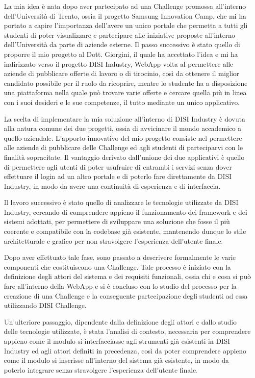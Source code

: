 La mia idea è nata dopo aver partecipato ad una Challenge promossa all'interno dell'Università di Trento, ossia il progetto Samsung Innovation Camp, che mi ha portato a capire l'importanza dell'avere un unico portale che permetta a tutti gli studenti di poter visualizzare e partecipare alle iniziative proposte all'interno dell'Università da parte di aziende esterne. Il passo successivo è stato quello di proporre il mio progetto al Dott. Giorgini, il quale ha accettato l'idea e mi ha indirizzato verso il progetto DISI Industry, WebApp volta al permettere alle aziende di pubblicare offerte di lavoro o di tirocinio, così da ottenere il miglior candidato possibile per il ruolo da ricoprire, mentre lo studente ha a disposizione una piattaforma nella quale può trovare varie offerte e cercare quella più in linea con i suoi desideri e le sue competenze, il tutto mediante un unico applicativo.

La scelta di implementare la mia soluzione all'interno di DISI Industry è dovuta alla natura comune dei due progetti, ossia di avvicinare il mondo accademico a quello aziendale. L'apporto innovativo del mio progetto consiste nel permettere alle aziende di pubblicare delle Challenge ed agli studenti di parteciparvi con le finalità sopracitate. Il vantaggio derivato dall'unione dei due applicativi è quello di permettere agli utenti di poter usufruire di entrambi i servizi senza dover effettuare il login ad un altro portale e di poterlo fare direttamente da DISI Industry, in modo da avere una continuità di esperienza e di interfaccia.


Il lavoro successivo è stato quello di analizzare le tecnologie utilizzate da DISI Industry, cercando di comprendere appieno il funzionamento dei framework e dei sistemi adottati, per permettere di sviluppare una soluzione che fosse il più coerente e compatibile con la codebase già esistente, mantenendo dunque lo stile architetturale e grafico per non stravolgere l'esperienza dell'utente finale.


Dopo aver effettuato tale fase, sono passato a descrivere formalmente le varie componenti che costituiscono una Challenge. Tale processo è iniziato con la definizione degli attori del sistema e dei requisiti funzionali, ossia chi e cosa si può fare all'interno della WebApp e si è concluso con lo studio del processo per la creazione di una Challenge e la conseguente partecipazione degli studenti ad essa utilizzando DISI Challenge.

Un'ulteriore passaggio, dipendente dalla definizione degli attori e dallo studio delle tecnologie utilizzate, è stata l'analisi di contesto, necessaria per comprendere appieno come il modulo si interfacciasse agli strumenti già esistenti in DISI Industry ed agli attori definiti in precedenza, così da poter comprendere appieno come il modulo si inserisse all'interno del sistema già esistente, in modo da poterlo integrare senza stravolgere l'esperienza dell'utente finale.

